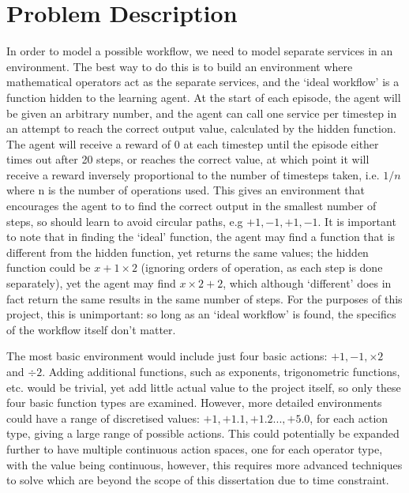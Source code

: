 \chapter{Problem Description}
In order to model a possible workflow, we need to model separate services in an environment. The best way to do this is to build an environment where mathematical operators act as the separate services, and the `ideal workflow' is a function hidden to the learning agent. At the start of each episode, the agent will be given an arbitrary number, and the agent can call one service per timestep in an attempt to reach the correct output value, calculated by the hidden function. The agent will receive a reward of 0 at each timestep until the episode either times out after 20 steps, or reaches the correct value, at which point it will receive a reward inversely proportional to the number of timesteps taken, i.e. $1/n$ where n is the number of operations used. This gives an environment that encourages the agent to to find the correct output in the smallest number of steps, so should learn to avoid circular paths, e.g $+1,-1,+1,-1$. It is important to note that in finding the `ideal' function, the agent may find a function that is different from the hidden function, yet returns the same values; the hidden function could be $x+1\times2$ (ignoring orders of operation, as each step is done separately), yet the agent may find $x\times2+2$, which although `different' does in fact return the same results in the same number of steps. For the purposes of this project, this is unimportant: so long as an `ideal workflow' is found, the specifics of the workflow itself don't matter.

	The most basic environment would include just four basic actions: $+1, -1, \times2$ and $\div2$. Adding additional functions, such as exponents, trigonometric functions, etc. would be trivial, yet add little actual value to the project itself, so only these four basic function types are examined. However, more detailed environments could have a range of discretised values: $+1, +1.1, +1.2...,+5.0$, for each action type, giving a large range of possible actions. This could potentially be expanded further to have multiple continuous action spaces, one for each operator type, with the value being continuous, however, this requires more advanced techniques to solve which are beyond the scope of this dissertation due to time constraint.

